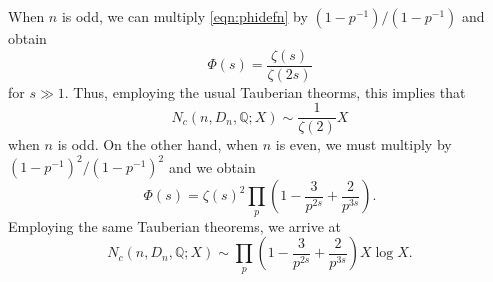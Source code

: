 \documentclass[11pt]{article}
\newcommand{\Q}{\mathbb{Q}}
\theoremstyle{definition}
\begin{document}
When $n$ is odd, we can multiply \eqref{eqn:phidefn} by $(1 - p^{-1})/(1 - p^{-1})$ and obtain
\[ \Phi(s) = \frac{\zeta(s)}{\zeta(2s)} \]
for $s \gg 1$. Thus, employing the usual Tauberian theorms, this implies that
\[ N_c(n, D_n, \Q; X) \sim \frac{1}{\zeta(2)}X \]
when $n$ is odd. On the other hand, when $n$ is even, we must multiply by $(1 - p^{-1})^2/(1 - p^{-1})^2$ and we obtain
\[ \Phi(s) = \zeta(s)^2 \prod_p \left( 1 - \frac{3}{p^{2s}} + \frac{2}{p^{3s}} \right). \]
Employing the same Tauberian theorems, we arrive at
\[ N_c(n, D_n, \Q; X) \sim \prod_p \left( 1 - \frac{3}{p^{2s}} + \frac{2}{p^{3s}} \right) X \log X. \]












{}

\end{document}
